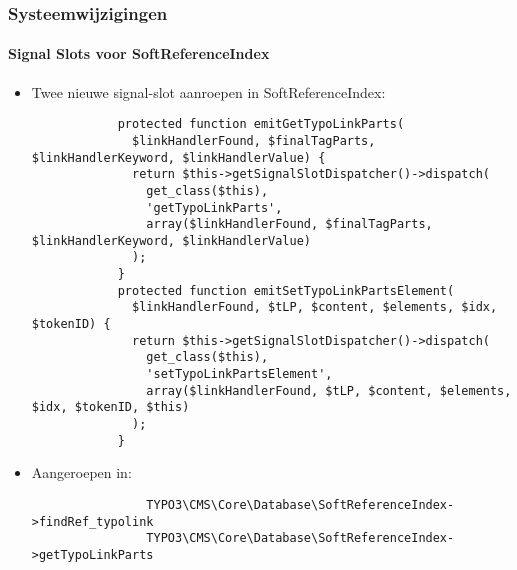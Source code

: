 \begin{frame}[fragile]
	\frametitle{Systeemwijzigingen}
	\framesubtitle{Signal Slots voor SoftReferenceIndex}

	\lstset{
		basicstyle=\tiny\ttfamily
	}

	\begin{itemize}
		\item
			\smaller
				Twee nieuwe signal-slot aanroepen in SoftReferenceIndex:
			\normalsize

		\begin{lstlisting}
			protected function emitGetTypoLinkParts(
			  $linkHandlerFound, $finalTagParts, $linkHandlerKeyword, $linkHandlerValue) {
			  return $this->getSignalSlotDispatcher()->dispatch(
			    get_class($this),
			    'getTypoLinkParts',
			    array($linkHandlerFound, $finalTagParts, $linkHandlerKeyword, $linkHandlerValue)
			  );
			}
			protected function emitSetTypoLinkPartsElement(
			  $linkHandlerFound, $tLP, $content, $elements, $idx, $tokenID) {
			  return $this->getSignalSlotDispatcher()->dispatch(
			    get_class($this),
			    'setTypoLinkPartsElement',
			    array($linkHandlerFound, $tLP, $content, $elements, $idx, $tokenID, $this)
			  );
			}
		\end{lstlisting}

		\item
			\smaller
				Aangeroepen in:
			\normalsize

			\begin{lstlisting}
				TYPO3\CMS\Core\Database\SoftReferenceIndex->findRef_typolink
				TYPO3\CMS\Core\Database\SoftReferenceIndex->getTypoLinkParts
			\end{lstlisting}

	\end{itemize}

\end{frame}


